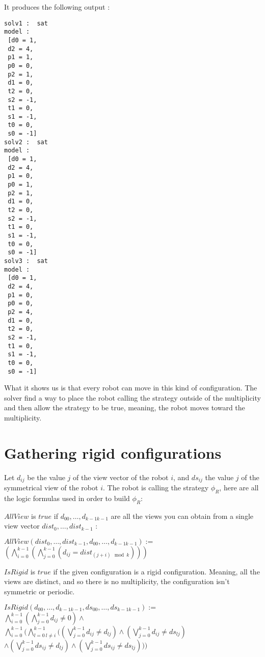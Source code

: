 \documentclass{article}
\begin{document}
It produces the following output :

\begin{lstlisting}
solv1 :  sat
model :
 [d0 = 1,
 d2 = 4,
 p1 = 1,
 p0 = 0,
 p2 = 1,
 d1 = 0,
 t2 = 0,
 s2 = -1,
 t1 = 0,
 s1 = -1,
 t0 = 0,
 s0 = -1]
solv2 :  sat
model :
 [d0 = 1,
 d2 = 4,
 p1 = 0,
 p0 = 1,
 p2 = 1,
 d1 = 0,
 t2 = 0,
 s2 = -1,
 t1 = 0,
 s1 = -1,
 t0 = 0,
 s0 = -1]
solv3 :  sat
model :
 [d0 = 1,
 d2 = 4,
 p1 = 0,
 p0 = 0,
 p2 = 4,
 d1 = 0,
 t2 = 0,
 s2 = -1,
 t1 = 0,
 s1 = -1,
 t0 = 0,
 s0 = -1]
\end{lstlisting}

What it shows us is that every robot can move in this kind of configuration. The solver find a way to place the robot calling the strategy outside of the multiplicity and then allow the strategy to be true, meaning, the robot moves toward the multiplicity.

\section{Gathering rigid configurations}

Let $d_{ij}$ be the value $j$ of the view vector of the robot $i$, and $ds_{ij}$ the value $j$ of the symmetrical 
view of the robot $i$.
The robot is calling the strategy $\phi_R$, here are all the logic formulas used in order to build $\phi_R$:

$AllView$ is $true$ if $d_{00}, \ldots ,d_{k-1k-1}$ are all the views you can obtain from a single view vector $dist_{0}, \ldots ,dist_{k-1}$ :

\begin{center}
    
$AllView(dist_{0}, \ldots ,dist_{k-1}, d_{00}, \ldots ,d_{k-1k-1}):=$\\
$(\bigwedge_{i=0}^{k-1} (\bigwedge_{j=0}^{k-1} (d_{ij} = dist_{(j+i) \mod{k}}) ) )$
\end{center}

$IsRigid$ is $true$ if the given configuration is a rigid configuration. Meaning, all the views are distinct, and so there is no multiplicity, the configuration isn't symmetric or periodic.

\begin{center}

$IsRigid(d_{00}, \ldots ,d_{k-1k-1}, ds_{00}, \ldots ,ds_{k-1k-1}):=$\\
$\bigwedge_{i=0}^{k-1}(\bigwedge_{j=0}^{k-1}d_{ij}\not=0)\land $\\%
$\bigwedge_{i=0}^{k-1}(
\bigwedge_{l=0\ l\not=i}^{k-1}(
(\bigvee_{j=0}^{k-1}d_{ij} \not= d_{lj})
\land (\bigvee_{j=0}^{k-1}d_{ij} \not= ds_{lj})$\\
$\land (\bigvee_{j=0}^{k-1}ds_{ij} \not= d_{lj})
\land (\bigvee_{j=0}^{k-1}ds_{ij} \not= ds_{lj})
) )$\\%
\end{center}
\end{document}
